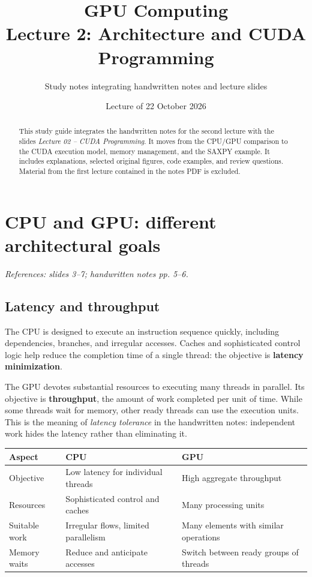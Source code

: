 \documentclass[11pt,a4paper]{article}
\title{\textbf{GPU Computing}\\[.4em]\Large Lecture 2: Architecture and CUDA Programming}
\author{Study notes integrating handwritten notes and lecture slides}
\date{Lecture of 22 October 2026}
\let\originalsection\section
\renewcommand{\section}{\Needspace{7\baselineskip}\originalsection}
\let\originalsubsection\subsection
\renewcommand{\subsection}{\Needspace{5\baselineskip}\originalsubsection}
\newcommand{\src}[1]{\par{\small\color{accent}\textit{References: #1.}}\par}
\begin{document}
\maketitle
\begin{abstract}
This study guide integrates the handwritten notes for the second lecture
with the slides \emph{Lecture 02 -- CUDA Programming}. It moves from the
CPU/GPU comparison to the CUDA execution model, memory management, and the
SAXPY example. It includes explanations, selected original figures, code
examples, and review questions. Material from the first lecture contained
in the notes PDF is excluded.
\end{abstract}
\tableofcontents
\newpage

\section{CPU and GPU: different architectural goals}
\src{slides 3--7; handwritten notes pp. 5--6}
\subsection{Latency and throughput}
The CPU is designed to execute an instruction sequence quickly, including
dependencies, branches, and irregular accesses. Caches and sophisticated
control logic help reduce the completion time of a single thread:
the objective is \textbf{latency minimization}.

The GPU devotes substantial resources to executing many threads in
parallel. Its objective is \textbf{throughput}, the amount of work completed
per unit of time. While some threads wait for memory, other ready threads
can use the execution units. This is the meaning of \emph{latency tolerance}
in the handwritten notes: independent work hides the latency rather than
eliminating it.

\begin{center}
\begin{tabularx}{\linewidth}{@{}lXX@{}}\toprule
Aspect & CPU & GPU \\\midrule
Objective & Low latency for individual threads & High aggregate throughput \\
Resources & Sophisticated control and caches & Many processing units \\
Suitable work & Irregular flows, limited parallelism & Many elements with similar operations \\
Memory waits & Reduce and anticipate accesses & Switch between ready groups of threads \\\bottomrule
\end{tabularx}
\end{center}
\end{document}
